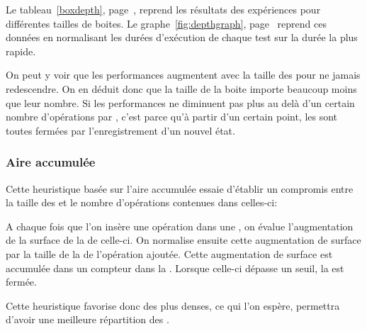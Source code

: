 				Le tableau~\ref{boxdepth}, page~\pageref{boxdepth}, reprend les résultats des expériences pour différentes tailles de boites.
				Le graphe~\ref{fig:depthgraph}, page~\pageref{fig:depthgraph} reprend ces données en normalisant les durées d'exécution de chaque
				test sur la durée la plus rapide. 

				On peut y voir que les performances augmentent avec la taille des \BO pour ne jamais redescendre. On en déduit donc que 
				la taille de la boite importe beaucoup moins que leur nombre. Si les performances ne diminuent pas plus au delà d'un
				certain nombre d'opérations par \BO, c'est parce qu'à partir d'un certain point, les \BO sont toutes fermées par 
				l'enregistrement d'un nouvel état. 

			\subsubsection{Aire accumulée}
				Cette heuristique basée sur l'aire accumulée essaie d'établir un compromis entre la taille des \BO et le nombre d'opérations
				contenues dans celles-ci:

				A chaque fois que l'on insère une opération dans une \BO, on évalue l'augmentation de la surface de la \BB de celle-ci. 
				On normalise ensuite cette augmentation de surface par la taille de la \BB de l'opération ajoutée. Cette augmentation
				de surface est accumulée dans un compteur dans la \BO. Lorsque celle-ci dépasse un seuil, la \BO est fermée. 

				Cette heuristique favorise donc des \BO plus denses, ce qui l'on espère, permettra d'avoir une meilleure répartition des
				\BO.

